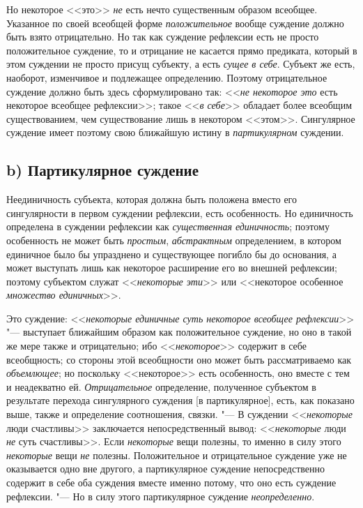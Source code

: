 Но некоторое <<это>>
{\em не} есть нечто
существенным образом всеобщее. Указанное по своей всеобщей форме
{\em положительное}
вообще суждение должно быть взято отрицательно. Но так как
суждение рефлексии есть не просто положительное суждение, то и отрицание не
касается прямо предиката, который в этом суждении не просто присущ
субъекту, а есть {\em сущее в себе}.
Субъект же есть, наоборот, изменчивое и подлежащее
определению. Поэтому отрицательное суждение должно быть здесь
сформулировано так: <<{\em не некоторое
это} есть некоторое всеобщее
рефлексии>>;
такое <<{\em в себе}>>
обладает более всеобщим существованием, чем существование
лишь в некотором <<этом>>. Сингулярное суждение имеет поэтому свою ближайшую
истину в {\em партикулярном}
суждении.

\subsection[b) Партикулярное суждение]{b) Партикулярное суждение}
Неединичность субъекта, которая должна быть положена вместо
его сингулярности в первом суждении рефлексии, есть особенность. Но
единичность определена в суждении рефлексии как
{\em существенная единичность};
поэтому особенность не может быть
{\em простым},
{\em абстрактным}
определением, в котором единичное было бы упразднено и
существующее погибло бы до основания, а может выступать лишь как некоторое
расширение его во внешней рефлексии; поэтому субъектом служат
<<{\em некоторые эти}>> или
<<некоторое особенное {\em множество
единичных}>>.

Это суждение:
<<{\em некоторые единичные суть некоторое
всеобщее рефлексии}>> "--- выступает ближайшим образом как
положительное суждение, но оно в такой же мере также и отрицательно; ибо
<<{\em некоторое}>>
содержит в себе всеобщность; со стороны этой всеобщности оно
может быть рассматриваемо как
{\em объемлющее}; но
поскольку <<некоторое>> есть особенность, оно вместе с тем и неадекватно ей.
{\em Отрицательное}
определение, полученное субъектом в результате перехода
сингулярного суждения [в партикулярное], есть, как показано выше, также и
определение соотношения, связки. "--- В суждении
<<{\em некоторые} люди
счастливы>> заключается непосредственный вывод:
<<{\em некоторые} люди
{\em не} суть счастливы>>.
Если {\em некоторые} вещи
полезны, то именно в силу этого
{\em некоторые} вещи
{\em не} полезны.
Положительное и отрицательное суждение уже не оказывается одно вне другого,
а партикулярное суждение непосредственно содержит в себе оба суждения
вместе именно потому, что оно есть суждение рефлексии. "--- Но
в силу этого партикулярное суждение
{\em неопределенно}.

